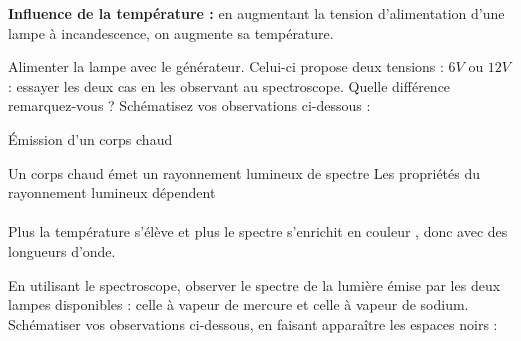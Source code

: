\textbf{Influence de la température :} en augmentant la tension d'alimentation d'une lampe à incandescence, on augmente sa température.

\mesure
  Alimenter la lampe avec le générateur.
  Celui-ci propose deux tensions : $6\unit{V}$ ou $12\unit{V}$ : essayer les deux cas en les observant au spectroscope.
  Quelle différence remarquez-vous ? 
  Schématisez vos observations ci-dessous :


\begin{doc}{Émission d'un corps chaud}
  \vspace*{-24pt}
  \begin{encart}
    Un corps chaud émet un rayonnement lumineux de spectre \reponseLigne
    Les propriétés du rayonnement lumineux dépendent \\[8pt]  \\[8pt]
    Plus la température s'élève et plus le spectre s'enrichit en couleur \reponseLigne
    , donc avec des  longueurs d'onde.
  \end{encart}
\end{doc}




\numeroQuestion
  En utilisant le spectroscope, observer le spectre de la lumière émise par les deux lampes disponibles : celle à vapeur de mercure et celle à vapeur de sodium.
  Schématiser vos observations ci-dessous, en faisant apparaître les espaces noirs :


